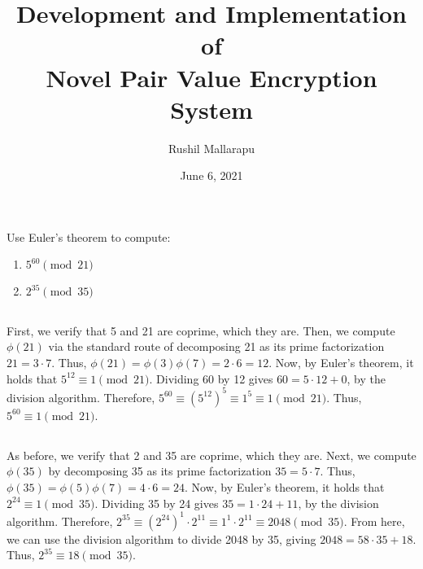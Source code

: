 \documentclass{article}
\title{Development and Implementation of\\Novel Pair Value Encryption System}
\author{Rushil Mallarapu}
\date{June 6, 2021}
\begin{document}
\maketitle

\section{}

Use Euler's theorem to compute:

\begin{enumerate}
    \item $5^{60} \pmod{21}$
    \item $2^{35} \pmod{35}$
\end{enumerate}

\subsection{}

First, we verify that 5 and 21 are coprime, which they are. Then, we compute $\phi(21)$ via the standard route of decomposing 21 as its prime factorization $21 = 3\cdot 7$. Thus, $\phi(21) = \phi(3)\phi(7) = 2 \cdot 6 = 12$. Now, by Euler's theorem, it holds that $5^{12} \equiv 1 \pmod{21}$. Dividing 60 by 12 gives $60 = 5 \cdot 12 + 0$, by the division algorithm. Therefore, $5^{60} \equiv (5^{12})^5 \equiv 1^5 \equiv 1 \pmod{21}$. Thus, $5^{60} \equiv 1 \pmod{21}$.

\subsection{}

As before, we verify that 2 and 35 are coprime, which they are. Next, we compute $\phi(35)$ by decomposing 35 as its prime factorization $35 = 5 \cdot 7$. Thus, $\phi(35) = \phi(5)\phi(7) = 4 \cdot 6 = 24$. Now, by Euler's theorem, it holds that $2^{24} \equiv 1 \pmod{35}$. Dividing 35 by 24 gives $35 = 1 \cdot 24 + 11$, by the division algorithm. Therefore, $2^{35} \equiv (2^{24})^1 \cdot 2^{11} \equiv 1^1 \cdot 2^{11} \equiv 2048 \pmod{35}$. From here, we can use the division algorithm to divide 2048 by 35, giving $2048 = 58 \cdot 35 + 18$. Thus, $2^{35} \equiv 18 \pmod{35}$.

\newpage

\section{}
\end{document}
